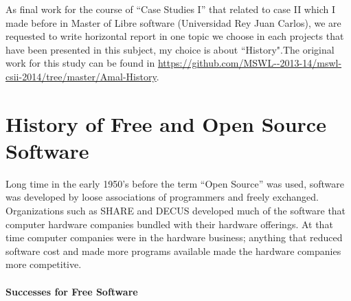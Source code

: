\documentclass[11pt]{article} %
\begin{document}
As final work for the course of “Case Studies I” that related to case II which I made before in Master of Libre software (Universidad Rey Juan Carlos), we are requested to write horizontal  report in one topic we choose in each projects that have been presented in this subject, my choice is about “History".The original work for this study can be found in  \url{https://github.com/MSWL--2013-14/mswl-csii-2014/tree/master/Amal-History}.

\section{History of Free and Open Source Software}

Long time in the early 1950's before the term “Open Source” was used, software was developed by loose associations of programmers and freely exchanged. Organizations such as SHARE and DECUS developed much of the software that computer hardware companies bundled with their hardware offerings. At that time computer companies were in the hardware business; anything that reduced software cost and made more programs available made the hardware companies more competitive.
\paragraph{Successes for Free Software}
\end{document}
